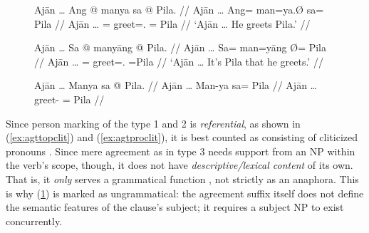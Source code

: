 \begin{figure}[h]
\pex\label{ex:agrctrl} %
\a\label{ex:agttopclit}\begingl
	\gla Ajān … Ang @ manya sa @ Pila. //
	\glb Ajān … Ang= man=ya.Ø sa= ​Pila //
	\glc Ajān … \AgtT{}= greet=\TsgM{}.\Top{} \Parg{}= ​Pila //
	\glft `Ajān … He greets Pila.' //
\endgl

\a\label{ex:agtproclit}\begingl
	\gla Ajān … Sa @ manyāng {} @ Pila. //
	\glb Ajān … Sa= man=yāng Ø= Pila //
	\glc Ajān … \PatT{}= greet=\TsgM{}.\Aarg{} \Top{}= ​Pila //
	\glft `Ajān … It's Pila that he greets.' //
\endgl

\a\label{ex:wrongagr}\ljudge* \begingl
	\gla Ajān … Manya sa @ Pila. //
	\glb Ajān … Man-ya sa= ​Pila //
	\glc Ajān … greet-\TsgM{} \Parg{}= ​Pila //
\endgl
\xe
\end{figure}

Since person marking of the type 1 and 2 is \emph{referential}, as shown in
(\ref{ex:agttopclit}) and (\ref{ex:agtproclit}), it is best counted as
consisting of cliticized pronouns \citep[103]{corbett2006}. Since mere
agreement as in type 3 needs support from an NP within the verb's scope,
though, it does not have \emph{descriptive/lexical content} of its own. That
is, it \emph{only} serves a grammatical function \citep[104]{corbett2006}, not
strictly as an anaphora. This is why (\ref{ex:wrongagr}) is marked as
ungrammatical: the agreement suffix  itself does not define the
semantic features of the clause's subject; it requires a subject NP to exist
concurrently.

